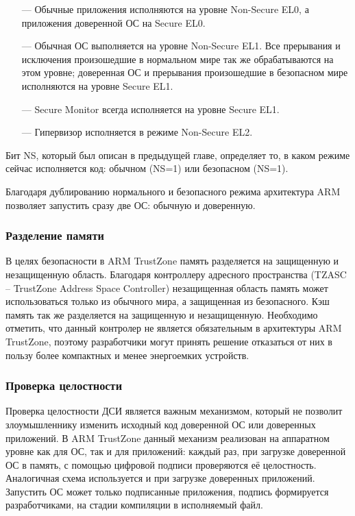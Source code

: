 \begin{itemize}
	\item [---] Обычные приложения исполняются на уровне Non-Secure EL0, а приложения доверенной ОС на Secure EL0.
	\item [---] Обычная ОС выполняется на уровне Non-Secure EL1. Все прерывания и исключения произошедшие в нормальном мире так же обрабатываются на этом уровне; доверенная ОС и прерывания произошедшие в безопасном мире исполняются на уровне Secure EL1.
	\item [---] Secure Monitor всегда исполняется на уровне Secure EL1.
	\item [---] Гипервизор исполняется в режиме Non-Secure EL2.
\end{itemize}

Бит NS, который был описан в предыдущей главе, определяет то, в каком режиме сейчас исполняется код: обычном (NS=1) или безопасном (NS=1).

Благодаря дублированию нормального и безопасного режима архитектура ARM позволяет запустить сразу две ОС: обычную и доверенную.

\subsubsection{Разделение памяти}

В целях безопасности в ARM TrustZone память разделяется на защищенную и незащищенную область. Благодаря контроллеру адресного пространства (TZASC -- TrustZone Address Space Controller) незащищенная область память может использоваться только из обычного мира, а защищенная из безопасного. Кэш память так же разделяется на защищенную и незащищенную. Необходимо отметить, что данный контролер не является обязательным в архитектуры ARM TrustZone, поэтому разработчики могут принять решение отказаться от них в пользу более компактных и менее энергоемких устройств.

\subsubsection{Проверка целостности}

Проверка целостности ДСИ является важным механизмом, который не позволит злоумышленнику изменить исходный код доверенной ОС или доверенных приложений. В ARM TrustZone данный механизм реализован на аппаратном уровне как для ОС, так и для приложений: каждый раз, при загрузке доверенной ОС в память, с помощью цифровой подписи проверяются её целостность. Аналогичная схема используется и при загрузке доверенных приложений. Запустить ОС может только подписанные приложения, подпись формируется разработчиками, на стадии компиляции в исполняемый файл.

